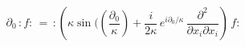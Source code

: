 \begin{equation}\label{37}
\partial_0\, :f:\,= \,:\left(\kappa\sin(\left(\frac{\partial_0}\kappa\right) +
\frac{i}{2\kappa}\,  e^{i\partial_0/\kappa}\, \frac{\partial^2}{\partial
x_i\partial x_i}\right)\, f:
\end{equation}

